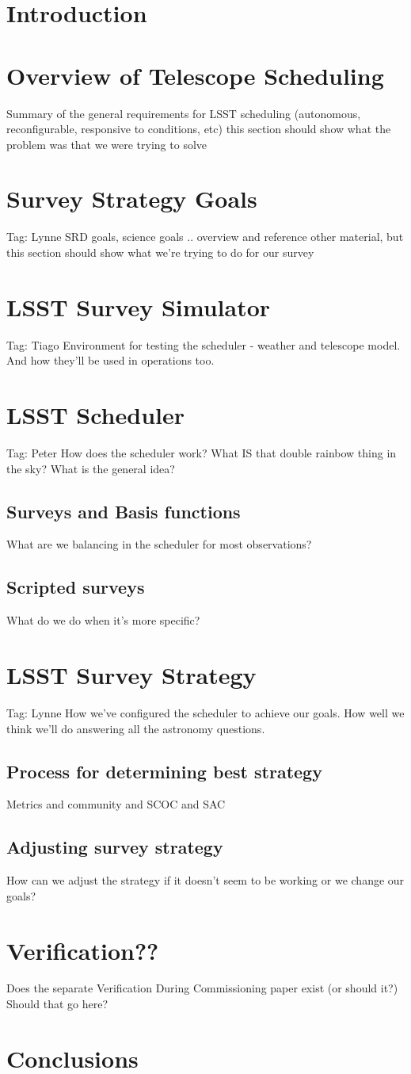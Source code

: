 \section{Introduction}


\section{Overview of Telescope Scheduling}
Summary of the general requirements for LSST scheduling (autonomous, reconfigurable, responsive to conditions, etc)
this section should show what the problem was that we were trying to solve

\section{Survey Strategy Goals}
Tag: Lynne
SRD goals, science goals .. overview and reference other material, but this section should show what we're trying to do for our survey 

\section{LSST Survey Simulator}
Tag: Tiago
Environment for testing the scheduler - weather and telescope model. And how they'll be used in operations too. 

\section{LSST Scheduler}
Tag: Peter
How does the scheduler work? What IS that double rainbow thing in the sky? 
What is the general idea? 
\subsection{Surveys and Basis functions}
What are we balancing in the scheduler for most observations?
\subsection{Scripted surveys}
What do we do when it's more specific?

\section{LSST Survey Strategy}
Tag: Lynne
How we've configured the scheduler to achieve our goals. How well we think we'll do answering all the astronomy questions.
\subsection{Process for determining best strategy}
Metrics and community and SCOC and SAC
\subsection{Adjusting survey strategy}
How can we adjust the strategy if it doesn't seem to be working or we change our goals?


\section{Verification??}
Does the separate Verification During Commissioning paper exist (or should it?) Should that go here?

\section{Conclusions}


